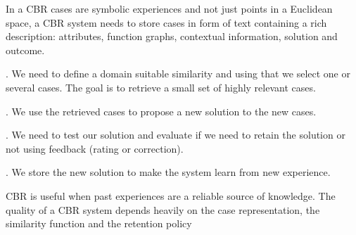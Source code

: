 In a CBR cases are symbolic experiences and not just points in a Euclidean space, a CBR system needs to store cases in form of text containing a rich description: attributes, function graphs, contextual information, solution and outcome.

.
We need to define a domain suitable similarity and using that we select one or several cases. The goal is to retrieve a small set of highly relevant cases.

.
We use the retrieved cases to propose a new solution to the new cases.

.
We need to test our solution and evaluate if we need to retain the solution or not using feedback (rating or correction).

.
We store the new solution to make the system learn from new experience.

\begin{remark}
    CBR is useful when past experiences are a reliable source of knowledge. The quality of a CBR system depends heavily on the case representation, the similarity function and the retention policy
\end{remark}
